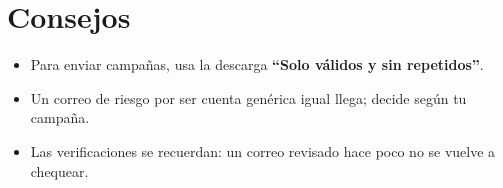 \documentclass[12pt]{article}
\begin{document}
\section{Consejos}
\begin{itemize}
    \item Para enviar campañas, usa la descarga \textbf{``Solo válidos y sin repetidos''}.
    \item Un correo de riesgo por ser cuenta genérica igual llega; decide según tu campaña.
    \item Las verificaciones se recuerdan: un correo revisado hace poco no se vuelve a chequear.
\end{itemize}
\end{document}
